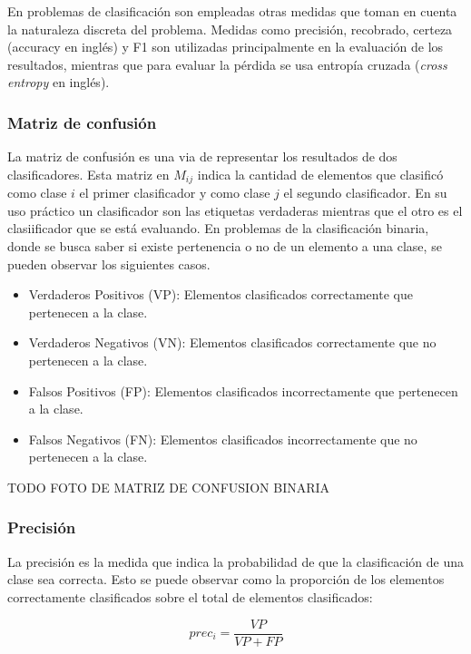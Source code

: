 En problemas de clasificación son empleadas otras medidas que toman en cuenta la naturaleza discreta del problema. 
Medidas como precisión, recobrado, certeza (accuracy en inglés) y F1 son utilizadas principalmente en la 
evaluación de los resultados, mientras que para evaluar la pérdida se usa entropía cruzada 
(\emph{cross entropy} en inglés).

\subsubsection{Matriz de confusión}

La matriz de confusión es una via de representar los resultados de dos clasificadores. Esta matriz en $M_{ij}$ 
indica la cantidad de elementos que clasificó como clase $i$ el primer clasificador y
como clase $j$ el segundo clasificador. En su uso práctico
un clasificador son las etiquetas verdaderas mientras que el otro es el clasiificador que se está evaluando. 
En problemas de la clasificación binaria, donde se busca saber si existe pertenencia o no de un elemento a una clase,
se pueden observar los siguientes casos.

\begin{itemize}
	\item Verdaderos Positivos (VP): Elementos clasificados correctamente que pertenecen a la clase.
	\item Verdaderos Negativos (VN): Elementos clasificados correctamente que no pertenecen a la clase.
	\item Falsos Positivos (FP): Elementos clasificados incorrectamente que pertenecen a la clase.
	\item Falsos Negativos (FN): Elementos clasificados incorrectamente que no pertenecen a la clase.
\end{itemize}

TODO FOTO DE MATRIZ DE CONFUSION BINARIA

\subsubsection{Precisión}

La precisión es la medida que indica la probabilidad de que la clasificación de una clase sea correcta. Esto 
se puede observar como la proporción de los elementos correctamente clasificados sobre el total de 
elementos clasificados:

\begin{equation}
	prec_i = \frac{VP}{VP + FP}
\end{equation}

